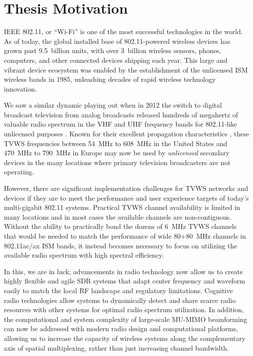 \section{Thesis Motivation}
\label{sec_introduction}

IEEE 802.11, or ``Wi-Fi'' is one of the most successful technologies in the world.
	As of today, the global installed base of 802.11-powered wireless devices has grown past 9.5~billion units, with over 3~billion wireless sensors, phones, computers, and other connected devices shipping each year\cite{wifi2018installed}.
	This large and vibrant device ecosystem was enabled by the establishment of the unlicensed \ac{ISM} wireless bands in 1985, unleashing decades of rapid wireless technology innovation.
	
	We saw a similar dynamic playing out when in 2012 the switch to digital broadcast television from analog broadcasts released hundreds of megahertz of valuable radio spectrum in the VHF and UHF frequency bands for 802.11-like unlicensed purposes \cite{fcc2010second, fcc2012third, fcc2015ro}.
	Known for their excellent propagation characteristics \cite{flores2013ieee80211af, stone1997nist}, these \acf{TVWS} frequencies between 54~MHz to 608~MHz in the United States and 470~MHz to 790~MHz in Europe may now be used by \emph{unlicensed} secondary devices in the many locations where primary television broadcasters are not operating.

	However, there are significant implementation challenges for \ac{TVWS} networks and devices if they are to meet the performance and user experience targets of today's multi-gigabit 802.11 systems.
	Practical \ac{TVWS} channel availability is limited in many locations and in most cases the available channels are non-contiguous.
	Without the ability to practically bond the dozens of 6~MHz \ac{TVWS} channels that would be needed to match the performance of wide 80+80~MHz channels in 802.11ac/ax \ac{ISM} bands, it instead becomes necessary to focus on utilizing the available radio spectrum with high spectral efficiency.

	In this, we are in luck; advancements in radio technology now allow us to create highly flexible and agile \acf{SDR} systems that adapt center frequency and waveform easily to match the local RF landscape and regulatory limitations.
	Cognitive radio technologies allow systems to dynamically detect and share scarce radio resources with other systems for optimal radio spectrum utilization.
	In addition, the computational and system complexity of large-scale \ac{MU-MIMO} beamforming can now be addressed with modern radio design and computational platforms, allowing us to increase the capacity of wireless systems along the complementary axis of spatial multiplexing, rather than just increasing channel bandwidth.
	
